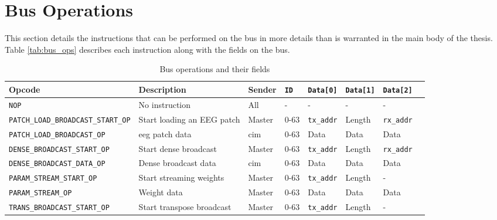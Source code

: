 \appendix
\section{Bus Operations}
\label{app:bus_ops}
This section details the instructions that can be performed on the bus in more details than is warranted in the main body of the thesis. Table \ref{tab:bus_ops} describes
each instruction along with the fields on the bus.

\begin{sidewaystable}
    \centering
    \renewcommand{\arraystretch}{1.2} %
    \setlength{\arrayrulewidth}{1.5pt} %
    \caption{Bus operations and their fields}
    \begin{tabular}{@{} p{6.5cm}lllllll @{}}
        \toprule
        Opcode                                      & Description                       & Sender        & \texttt{ID}   & \texttt{Data[0]}  & \texttt{Data[1]}  & \texttt{Data[2]} \\\midrule
        \texttt{NOP}                                & No instruction                    & All           & -             & -                 & -                 & - \\
        \texttt{PATCH\_LOAD\_BROADCAST\_START\_OP}  & Start loading an EEG patch        & Master        & 0-63          & \texttt{tx\_addr} & Length            & \texttt{rx\_addr} \\
        \texttt{PATCH\_LOAD\_BROADCAST\_OP}         & \ac{eeg} patch data               & \ac{cim}      & 0-63          & Data              & Data              & Data \\
        \texttt{DENSE\_BROADCAST\_START\_OP}        & Start dense broadcast             & Master        & 0-63          & \texttt{tx\_addr} & Length            & \texttt{rx\_addr} \\
        \texttt{DENSE\_BROADCAST\_DATA\_OP}         & Dense broadcast data              & \ac{cim}      & 0-63          & Data              & Data              & Data \\
        \texttt{PARAM\_STREAM\_START\_OP}           & Start streaming weights           & Master        & 0-63          & \texttt{tx\_addr} & Length            & - \\
        \texttt{PARAM\_STREAM\_OP}                  & Weight data                       & Master        & 0-63          & Data              & Data              & Data \\
        \texttt{TRANS\_BROADCAST\_START\_OP}        & Start transpose broadcast         & Master        & 0-63          & \texttt{tx\_addr} & Length            & - \\

\end{tabular}
\end{sidewaystable}
